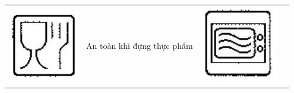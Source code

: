 \documentclass[10pt]{article}
\begin{document}
\begin{center}
\begin{tabular}{|l|l|l|l|}
\hline
\includegraphics[max width=\textwidth]{2025_10_23_3f52bbaab6caa9e2ff75g-08(1)}
 & An toàn khi đựng thực phẩm & \includegraphics[max width=\textwidth]{2025_10_23_3f52bbaab6caa9e2ff75g-08}

\end{tabular}
\end{center}
\end{document}
